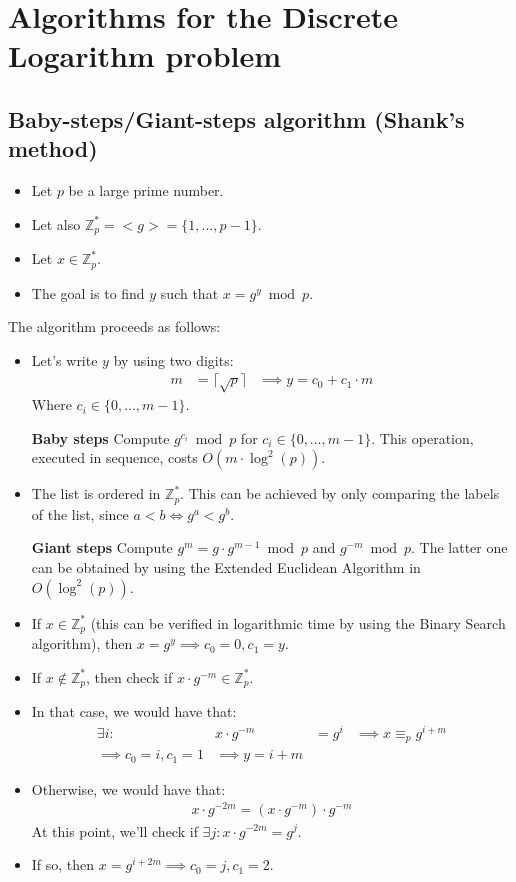 \section{Algorithms for the Discrete Logarithm problem}

\subsection{Baby-steps/Giant-steps algorithm (Shank's method)}
\begin{itemize}
    \item Let $p$ be a large prime number.
    \item Let also $\mathbb{Z}_{p}^{*} = <g> = \{1, \dots, p-1\}$.
    \item Let $x \in \mathbb{Z}_{p}^{*}$.
    \item The goal is to find $y$ such that $x = g^{y} \bmod p$.
\end{itemize}
The algorithm proceeds as follows:
\begin{itemize}
    \item Let's write $y$ by using two digits:
    \begin{align*}
        m &= \lceil \sqrt{p} \rceil &\implies y = c_{0} + c_{1} \cdot m
    \end{align*}
    Where $c_{i} \in \{0, \dots, m - 1\}$.
    \item[\textbf{Baby steps}] Compute $g^{c_{i}} \bmod p$ for $c_{i} \in \{0, \dots, m - 1\}$. This operation, executed in sequence, costs $O(m \cdot \operatorname{log}^{2}(p))$.
    \item The list is ordered in $\mathbb{Z}_{p}^{*}$. This can be achieved by only comparing the labels of the list, since $a < b \iff g^{a} < g^{b}$.
    \item[\textbf{Giant steps}] Compute $g^{m} = g \cdot g^{m-1} \bmod p$ and $g^{-m} \bmod p$. The latter one can be obtained by using the Extended Euclidean Algorithm in $O(\operatorname{log}^{2}(p))$.
    \item If $x \in \mathbb{Z}_{p}^{*}$ (this can be verified in logarithmic time by using the Binary Search algorithm), then $x = g^{y} \implies c_{0} = 0, c_{1} = y$.
    \item If $x \not\in \mathbb{Z}_{p}^{*}$, then check if $x \cdot g^{-m} \in \mathbb{Z}_{p}^{*}$.
    \item In that case, we would have that:
        \begin{align*}
            \exists i: & x \cdot g^{-m} &= g^{i} &\implies x \equiv_{p} g^{i + m}\\
            \implies c_{0} = i, c_{1} = 1 & \implies y = i + m
        \end{align*}
    \item Otherwise, we would have that:
        \begin{align*}
            x \cdot g^{-2m} = (x \cdot g^{-m}) \cdot g^{-m}
        \end{align*}
    At this point, we'll check if $\exists j: x \cdot g^{-2m} = g^{j}$.
    \item If so, then $x = g^{i + 2m} \implies c_{0} = j, c_{1} = 2$.
\end{itemize}

